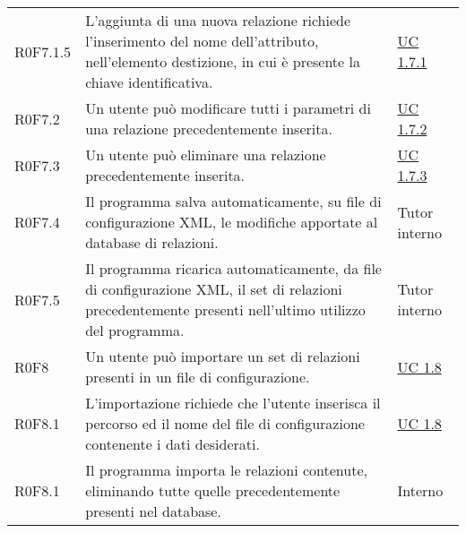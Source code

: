 \begin{center}
\begin{longtable}{p{4.2cm}!{\color{white}\vrule width 0.5mm}p{6cm}!{\color{white}\vrule width 0.5mm}p{2.5cm}!{\color{white}\vrule width 0.5mm}}
				\hspace{4mm}\hypertarget{XER0F7.1.5}{R0F7.1.5} & L'aggiunta di una nuova relazione richiede l'inserimento del nome dell'attributo, nell'elemento destizione, in cui è presente la chiave identificativa. & \hyperref[subsec:XEUC1.7.1]{UC 1.7.1}\\	
				
			
			\hspace{2mm}\hypertarget{XER0F7.2}{R0F7.2} & Un utente può modificare tutti i parametri di una relazione precedentemente inserita. & \hyperref[subsec:XEUC1.7.2]{UC 1.7.2}\\
		
			\hspace{2mm}\hypertarget{XER0F7.3}{R0F7.3} & Un utente può eliminare una relazione precedentemente inserita. & \hyperref[subsec:XEUC1.7.3]{UC 1.7.3}\\
		
			\hspace{2mm}\hypertarget{XER0F7.4}{R0F7.4} & Il programma salva automaticamente, su file di configurazione XML, le modifiche apportate al database di relazioni. & Tutor interno\\
		
			\hspace{2mm}\hypertarget{XER0F7.5}{R0F7.5} & Il programma ricarica automaticamente, da file di configurazione XML, il set di relazioni precedentemente presenti nell'ultimo utilizzo del programma. & Tutor interno\\
			
		
		\hspace{0mm}\hypertarget{XER0F8}{R0F8} & Un utente può importare un set di relazioni presenti in un file di configurazione. & \hyperref[subsec:XEUC1.8]{UC 1.8}\\
		
			\hspace{2mm}\hypertarget{XER0F8.1}{R0F8.1} & L'importazione richiede che l'utente inserisca il percorso ed il nome del file di configurazione contenente i dati desiderati. & \hyperref[subsec:XEUC1.8]{UC 1.8}\\
			
			\hspace{2mm}\hypertarget{XER0F8.1}{R0F8.1} & Il programma importa le relazioni contenute, eliminando tutte quelle precedentemente presenti nel database. & Interno\\
		

\end{longtable}
\end{center}
